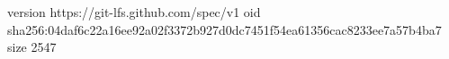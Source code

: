 version https://git-lfs.github.com/spec/v1
oid sha256:04daf6c22a16ee92a02f3372b927d0dc7451f54ea61356cac8233ee7a57b4ba7
size 2547
